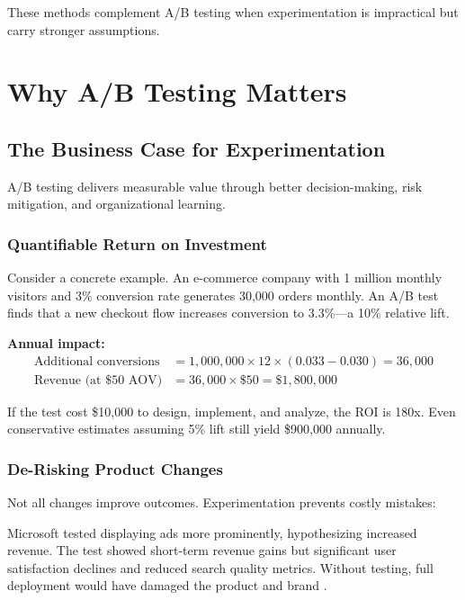 These methods complement A/B testing when experimentation is impractical but carry stronger assumptions.

\section{Why A/B Testing Matters}

\subsection{The Business Case for Experimentation}

A/B testing delivers measurable value through better decision-making, risk mitigation, and organizational learning.

\subsubsection{Quantifiable Return on Investment}

Consider a concrete example. An e-commerce company with 1 million monthly visitors and 3\% conversion rate generates 30,000 orders monthly. An A/B test finds that a new checkout flow increases conversion to 3.3\%—a 10\% relative lift.

\textbf{Annual impact:}
\begin{align}
\text{Additional conversions} &= 1{,}000{,}000 \times 12 \times (0.033 - 0.030) = 36{,}000 \\
\text{Revenue (at \$50 AOV)} &= 36{,}000 \times \$50 = \$1{,}800{,}000
\end{align}

If the test cost \$10,000 to design, implement, and analyze, the ROI is 180x. Even conservative estimates assuming 5\% lift still yield \$900,000 annually.

\subsubsection{De-Risking Product Changes}

Not all changes improve outcomes. Experimentation prevents costly mistakes:

\begin{example}
Microsoft tested displaying ads more prominently, hypothesizing increased revenue. The test showed short-term revenue gains but significant user satisfaction declines and reduced search quality metrics. Without testing, full deployment would have damaged the product and brand \citep{kohavi2009online}.
\end{example}

